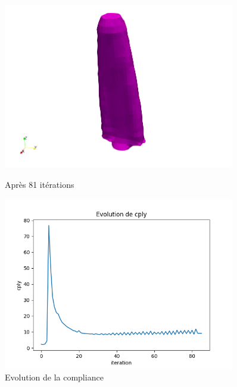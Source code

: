 \documentclass[11pt,a4paper]{article}
\begin{document}
\begin{figure}[H]
	\begin{minipage}{0.48\textwidth}
		\includegraphics[width=0.9\textwidth]{toutnonfixe.png}
		\caption{Après 81 itérations}
	\end{minipage}	
	\begin{minipage}{0.48\textwidth}
		\includegraphics[width=0.9\textwidth]{toutNonFixecply.png}
		\caption{Evolution de la compliance}
	\end{minipage}	
\end{figure}
\end{document}
